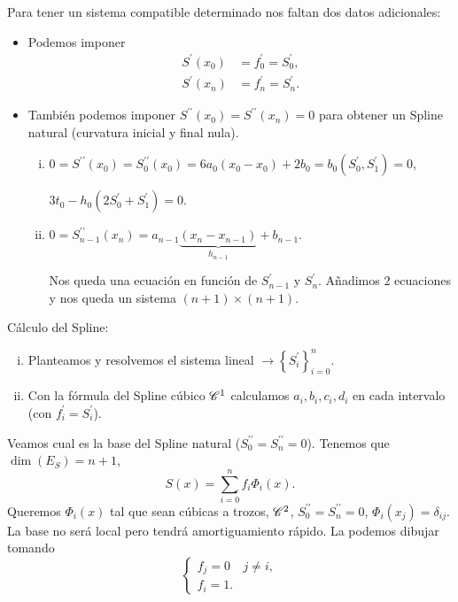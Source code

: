 Para tener un sistema compatible determinado nos faltan dos datos adicionales:
\begin{itemize}
    \item Podemos imponer
        \begin{align*}
            S^{\prime}\left( x_0 \right) &= f^{\prime}_0 = S^{\prime}_0, \\
            S^{\prime}\left( x_n \right) &= f^{\prime}_n = S^{\prime}_n.
        \end{align*}
    \item También podemos imponer $S^{\prime\prime}\left( x_0 \right) = S^{\prime\prime}\left( x_n \right) = 0$ para obtener un Spline natural (curvatura inicial y final nula).
        \begin{enumerate}[i)]
            \item $0=S^{\prime\prime}\left( x_0 \right)=S^{\prime\prime}_0\left( x_0 \right)=6a_0\left( x_0-x_0 \right)+2b_0 = b_0(S^{\prime}_0, S^{\prime}_1) = 0$,

                $3t_0-h_0\left( 2S^{\prime}_0+S^{\prime}_1 \right)=0$.
            \item $0=S^{\prime\prime}_{n-1}\left( x_n \right) = a_{n-1} \underbrace{\left( x_n-x_{n-1} \right)}_{h_{n-1}} + b_{n-1}$.

                Nos queda una ecuación en función de $S^{\prime}_{n-1}$ y $S^{\prime}_n$. Añadimos $2$ ecuaciones y nos queda un sistema $\left( n+1 \right)\times \left( n+1 \right)$.
        \end{enumerate}
\end{itemize}

Cálculo del Spline:
\begin{enumerate}[i)]
    \item Planteamos y resolvemos el sistema lineal $\rightarrow \left\{ S^{\prime}_i \right\}_{i=0}^n$.
    \item Con la fórmula del Spline cúbico $\mathscr{C}^1$ calculamos $a_i, b_i, c_i, d_i$ en cada intervalo (con $f^{\prime}_i=S^{\prime}_i$).
\end{enumerate}

Veamos cual es la base del Spline natural ($S^{\prime\prime}_0=S^{\prime\prime}_n=0$). Tenemos que $\dim\left( E_S \right)=n+1$,
\[
    S\left( x \right) = \sum_{i=0}^n f_i \Phi_i\left( x \right).
\]
Queremos $\Phi_i\left( x \right)$ tal que sean cúbicas a trozos, $\mathscr{C}^2$, $S^{\prime\prime}_0=S^{\prime\prime}_n=0$, $\Phi_i\left( x_j \right) = \delta_{ij}$. La base no será local pero tendrá amortiguamiento rápido. La podemos dibujar tomando
\[
    \begin{cases}
        f_j = 0 & j\neq i, \\
        f_i = 1.
    \end{cases}
\]

